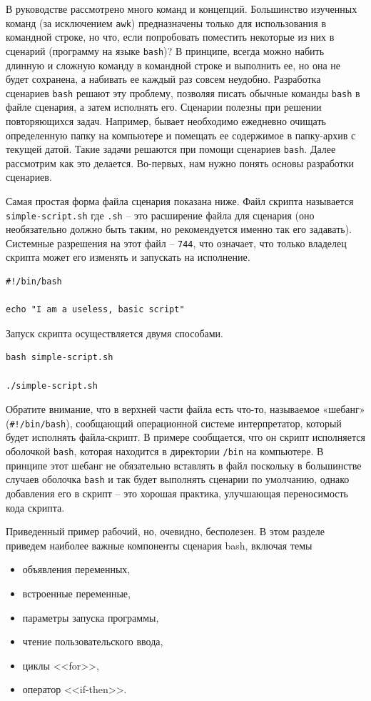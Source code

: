 \documentclass[12pt]{article}
\providecommand{\tightlist}{%
  \setlength{\itemsep}{0pt}\setlength{\parskip}{0pt}}
\begin{document}
В руководстве рассмотрено много команд и концепций. Большинство
изученных команд (за исключением \texttt{awk}) предназначены только для
использования в командной строке, но что, если попробовать поместить
некоторые из них в сценарий (программу на языке \texttt{bash})? В принципе,
всегда можно набить длинную и сложную команду в командной строке и выполнить ее,
но она не будет сохранена, а набивать ее каждый раз совсем неудобно.
Разработка сценариев \texttt{bash} решают эту проблему, позволяя писать обычные
команды \texttt{bash} в файле сценария, а затем исполнять его. Сценарии полезны
при решении повторяющихся задач. Например, бывает необходимо
ежедневно очищать определенную папку на компьютере и помещать ее
содержимое в папку-архив с текущей датой. Такие задачи решаются при
помощи сценариев \texttt{bash}. Далее рассмотрим как это делается.
Во-первых, нам нужно понять основы разработки сценариев.

Самая простая форма файла сценария показана ниже. Файл скрипта
называется \texttt{simple-script.sh} где \texttt{.sh} -- это расширение
файла для сценария (оно необязательно должно быть таким, но
рекомендуется именно так его задавать). Системные разрешения на этот файл --
\texttt{744}, что означает, что только владелец скрипта может его
изменять и запускать на исполнение.
\begin{verbatim}
#!/bin/bash

echo "I am a useless, basic script"
\end{verbatim}

Запуск скрипта осуществляется двумя способами.
\begin{verbatim}
bash simple-script.sh

./simple-script.sh
\end{verbatim}

Обратите внимание, что в верхней части файла есть что-то, называемое
«шебанг» (\texttt{\#!/bin/bash}), сообщающий операционной системе
интерпретатор, который будет исполнять файла-скрипт. В примере
сообщается, что он скрипт исполняется оболочкой \texttt{bash}, которая находится
в директории \texttt{/bin} на компьютере. В принципе этот шебанг
не обязательно вставлять в файл поскольку в большинстве случаев оболочка \texttt{bash} и так будет
выполнять сценарии по умолчанию, однако добавления его в
скрипт -- это хорошая практика, улучшающая переносимость кода скрипта.

Приведенный пример рабочий, но, очевидно, бесполезен. В этом разделе
приведем наиболее важные компоненты сценария bash, включая темы
\begin{itemize}
\tightlist
\item
  объявления переменных,
\item
  встроенные переменные,
\item
  параметры запуска программы,
\item
  чтение пользовательского ввода,
\item
  циклы <<for>>,
\item
  оператор <<if-then>>.
\end{itemize}
\end{document}
